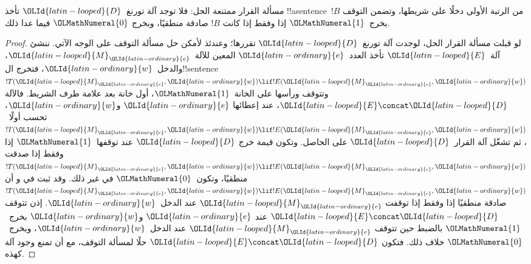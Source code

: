 \documentclass[../../../include/open-logic-section]{subfiles}
\begin{document}

\begin{thm}
مسألة القرار ممتنعة الحل: فلا توجد آلة تورنغ~$\OLId{latin-looped}{D}$ تأخذ
!!a{sentence}~$!B$ من الرتبة الأولى دخلًا على شريطها، وتضمن
التوقف بخرج~$\OLMathNumeral{1}$ إذا وفقط إذا كانت $!B$ صادقة منطقيًا، وبخرج
$\OLMathNumeral{0}$ فيما عدا ذلك.
\end{thm}

\begin{proof}
لو قبلت مسألة القرار الحل، لوجدت آلة تورنغ~$\OLId{latin-looped}{D}$ تقررها؛ وعندئذ
لأمكن حل مسألة التوقف على الوجه الآتي. ننشئ آلة~$\OLId{latin-looped}{E}$ تأخذ
  العدد~$\OLId{latin-ordinary}{e}$ المعين للآلة~$\OLId{latin-looped}{M}_\OLId{latin-ordinary}{e}$، والدخل~$\OLId{latin-ordinary}{w}$، فتخرج
  ال!!{sentence} $!T(\OLId{latin-looped}{M}_\OLId{latin-ordinary}{e},\OLId{latin-ordinary}{w})\lif !E(\OLId{latin-looped}{M}_\OLId{latin-ordinary}{e},\OLId{latin-ordinary}{w})$ وتتوقف ورأسها على
  الخانة~$\OLMathNumeral{1}$، أول خانة بعد علامة طرف الشريط. فالآلة $\OLId{latin-looped}{E}\concat \OLId{latin-looped}{D}$، عند إعطائها
$\OLId{latin-ordinary}{e}$ و$\OLId{latin-ordinary}{w}$، تحسب أولًا~$!T(\OLId{latin-looped}{M}_\OLId{latin-ordinary}{e},\OLId{latin-ordinary}{w})\lif !E(\OLId{latin-looped}{M}_\OLId{latin-ordinary}{e},\OLId{latin-ordinary}{w})$، ثم تشغّل
آلة القرار~$\OLId{latin-looped}{D}$ على الحاصل. وتكون قيمة خرج $\OLId{latin-looped}{D}$ عند توقفها~$\OLMathNumeral{1}$
إذا وفقط إذا صدقت $!T(\OLId{latin-looped}{M}_\OLId{latin-ordinary}{e},\OLId{latin-ordinary}{w})\lif !E(\OLId{latin-looped}{M}_\OLId{latin-ordinary}{e},\OLId{latin-ordinary}{w})$ منطقيًا،
وتكون~$\OLMathNumeral{0}$ في غير ذلك. وقد ثبت في 
و أن
$!T(\OLId{latin-looped}{M}_\OLId{latin-ordinary}{e},\OLId{latin-ordinary}{w})\lif !E(\OLId{latin-looped}{M}_\OLId{latin-ordinary}{e},\OLId{latin-ordinary}{w})$ صادقة منطقيًا إذا وفقط إذا توقفت
$\OLId{latin-looped}{M}_\OLId{latin-ordinary}{e}$ عند الدخل~$\OLId{latin-ordinary}{w}$. إذن تتوقف $\OLId{latin-looped}{E}\concat \OLId{latin-looped}{D}$ عند
$\OLId{latin-ordinary}{e}$ و$\OLId{latin-ordinary}{w}$ بخرج~$\OLMathNumeral{1}$ بالضبط حين تتوقف $\OLId{latin-looped}{M}_\OLId{latin-ordinary}{e}$ عند الدخل~$\OLId{latin-ordinary}{w}$،
وبخرج~$\OLMathNumeral{0}$ خلاف ذلك. فتكون $\OLId{latin-looped}{E}\concat \OLId{latin-looped}{D}$ حلًا لمسألة التوقف،
  مع أن  تمنع وجود آلة كهذه.
\end{proof}
\end{document}
